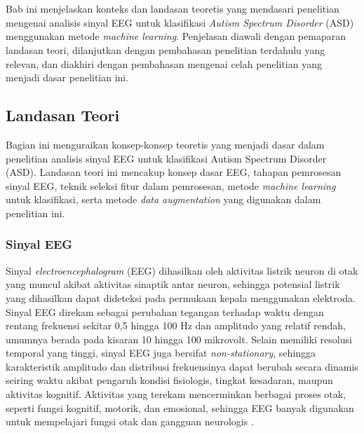 \chapter{\babDua}
\label{cha:Tinjauan Pustaka}
Bab ini menjelaskan konteks dan landasan teoretis yang mendasari penelitian mengenai analisis sinyal EEG untuk klasifikasi \textit{Autism Spectrum Disorder} (ASD) menggunakan metode \textit{machine learning}. Penjelasan diawali dengan pemaparan landasan teori, dilanjutkan dengan pembahasan penelitian terdahulu yang relevan, dan diakhiri dengan pembahasan mengenai celah penelitian yang menjadi dasar penelitian ini.
\section{Landasan Teori}
\label{sec:landasan_teori}
Bagian ini menguraikan konsep-konsep teoretis yang menjadi dasar dalam penelitian analisis sinyal EEG untuk klasifikasi Autism Spectrum Disorder (ASD). Landasan teori ini mencakup konsep dasar EEG, tahapan pemrosesan sinyal EEG, teknik seleksi fitur dalam pemrosesan, metode \textit{machine learning} untuk klasifikasi, serta metode \textit{data augmentation} yang digunakan dalam penelitian ini.

\subsection{Sinyal EEG}
\label{Konsep Dasar Sinyal EEG}

Sinyal \textit{electroencephalogram} (EEG) dihasilkan oleh aktivitas listrik neuron di otak yang muncul akibat aktivitas sinaptik antar neuron, sehingga potensial listrik yang dihasilkan dapat dideteksi pada permukaan kepala menggunakan elektroda. Sinyal EEG direkam sebagai perubahan tegangan terhadap waktu dengan rentang frekuensi sekitar 0,5 hingga 100 Hz dan amplitudo yang relatif rendah, umumnya berada pada kisaran 10 hingga 100 mikrovolt. Selain memiliki resolusi temporal yang tinggi, sinyal EEG juga bersifat \textit{non-stationary}, sehingga karakteristik amplitudo dan distribusi frekuensinya dapat berubah secara dinamis seiring waktu akibat pengaruh kondisi fisiologis, tingkat kesadaran, maupun aktivitas kognitif. Aktivitas yang terekam mencerminkan berbagai proses otak, seperti fungsi kognitif, motorik, dan emosional, sehingga EEG banyak digunakan untuk mempelajari fungsi otak dan gangguan neurologis \cite{eeg_basics}.

